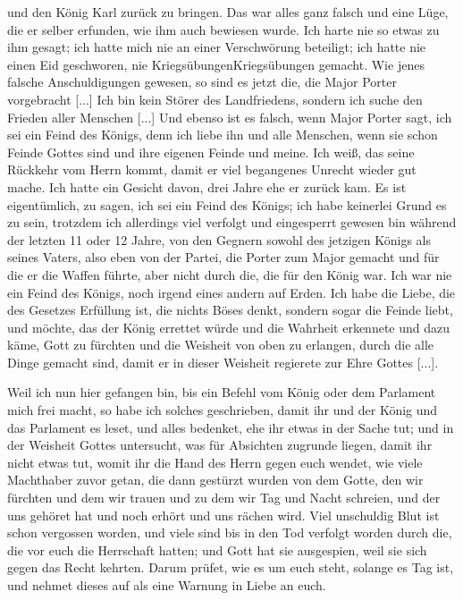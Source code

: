   und den König Karl zurück zu bringen. Das war alles ganz
  falsch und eine Lüge, die er selber erfunden, wie ihm auch bewiesen 
  wurde. Ich harte nie so etwas zu ihm gesagt; ich hatte
  mich nie an einer Verschwörung beteiligt; ich hatte nie einen Eid
  geschworen, nie Kriegsübungen\indexname{Kriegsübungen} gemacht. Wie jenes falsche 
  Anschuldigungen gewesen, so sind es jetzt die, die Major Porter 
  vorgebracht [...] Ich bin kein Störer des Landfriedens, sondern
  ich suche den Frieden aller Menschen [...] Und ebenso ist es
  falsch, wenn Major Porter sagt, ich sei ein Feind des Königs,
  denn ich liebe ihn und alle Menschen, wenn sie schon Feinde
  Gottes sind und ihre eigenen Feinde und meine. Ich weiß, das
  seine Rückkehr vom Herrn kommt, damit er viel begangenes Unrecht 
  wieder gut mache. Ich hatte ein Gesicht davon, drei Jahre
  ehe er zurück kam. Es ist eigentümlich, zu sagen, ich sei ein
  Feind des Königs; ich habe keinerlei Grund es zu sein, trotzdem
  ich allerdings viel verfolgt und eingesperrt gewesen bin während
  der letzten 11 oder 12 Jahre, von den Gegnern sowohl des
  jetzigen Königs als seines Vaters, also eben von der Partei, die
  Porter zum Major gemacht und für die er die Waffen führte,
  aber nicht durch die, die für den König war. Ich war nie ein
  Feind des Königs, noch irgend eines andern auf Erden. Ich
  habe die Liebe, die des Gesetzes Erfüllung ist, die nichts Böses
  denkt, sondern sogar die Feinde liebt, und möchte, das der König
  errettet würde und die Wahrheit erkennete und dazu käme, Gott
  zu fürchten und die Weisheit von oben zu erlangen, durch die
  alle Dinge gemacht sind, damit er in dieser Weisheit regierete zur
  Ehre Gottes [...].

  \medskip 

  Weil ich nun hier gefangen bin, bis ein Befehl vom König
  oder dem Parlament mich frei macht, so habe ich solches geschrieben, 
  damit ihr und der König und das Parlament es
  leset, und alles bedenket, ehe ihr etwas in der Sache tut; und
  in der Weisheit Gottes untersucht, was für Absichten zugrunde 
  liegen, damit ihr nicht etwas tut, womit ihr die Hand
  des Herrn gegen euch wendet, wie viele Machthaber zuvor getan,
  die dann gestürzt wurden von dem Gotte, den wir fürchten und
  dem wir trauen und zu dem wir Tag und Nacht schreien, und
  der uns gehöret hat und noch erhört und uns rächen wird. Viel
  unschuldig Blut ist schon vergossen worden, und viele sind bis in
  den Tod verfolgt worden durch die, die vor euch die Herrschaft
  hatten; und Gott hat sie ausgespien, weil sie sich gegen das
  Recht kehrten. Darum prüfet, wie es um euch steht, solange es
  Tag ist, und nehmet dieses auf als eine Warnung in Liebe
  an euch.\grqq{}

